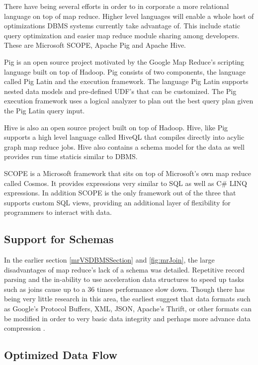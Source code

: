 \documentclass[10pt,twocolumn]{IEEEtran11}
\begin{document}
There have being several efforts in order to in corporate a more relational language on top of map reduce.  Higher level languages will enable a whole host of optimizations DBMS systems currently take advantage of.  This include static query optimization and easier map reduce module sharing among developers.  These are Microsoft SCOPE\cite{chaiken2008scope}, Apache Pig \cite{olston2008pig} and Apache Hive\cite{thusoo2009hive}.
\par
Pig is an open source project motivated by the Google Map Reduce's scripting language built on top of Hadoop.  Pig consists of two components, the language called Pig Latin and the execution framework.  The language Pig Latin supports nested data models and pre-defined UDF's that can be customized.  The Pig execution framework uses a logical analyzer to plan out the best query plan given the Pig Latin query input.
\par
Hive is also an open source project built on top of Hadoop.  Hive, like Pig supports a high level language called HiveQL that compiles directly into acylic graph map reduce jobs.  Hive also contains a schema model for the data as well provides run time staticis similar to DBMS.
\par
SCOPE is a Microsoft framework that sits on top of Microsoft's own map reduce called Cosmos.  It provides expressions very similar to SQL as well as C\# LINQ expressions.  In addition SCOPE is the only framework out of the three that supports custom SQL views, providing an additional layer of flexibility for programmers to interact with data.

\subsection{Support for Schemas}

In the earlier section \ref{mrVSDBMSSection} and \ref{fig:mrJoin}, the large disadvantages of map reduce's lack of a schema was detailed.   Repetitive record parsing and the in-ability to use acceleration data structures to speed up tasks such as joins cause up to a 36 times performance slow down.  Though there has being very little research in this area, the earliest suggest that data formats such as Google's Protocol Buffers,
XML, JSON, Apache's Thrift, or other formats can be modified in order to very basic data integrity and perhaps more advance data compression \cite{yang2007map}.

\subsection{Optimized Data Flow}
\end{document}
